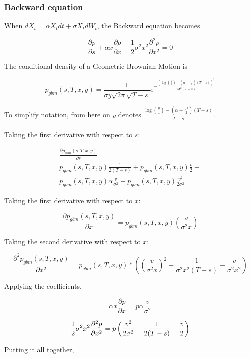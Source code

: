 \documentclass{article}
\theoremstyle{definition}
\begin{document}
\subsubsection{Backward equation}
When \(dX_t=\alpha X_t dt+\sigma X_t dW_t\), the Backward equation becomes

\[\frac{\partial p} {\partial s} +\alpha x \frac{\partial p}{\partial x} + \frac{1}{2} \sigma^2 x^2 \frac{\partial^2 p}{\partial x^2} =0\]

The conditional density of a Geometric Brownian Motion is

\[p_{gbm}(s, T, x, y)=\frac{1}{\sigma y\sqrt{2\pi} \sqrt{T-s} } e^{-\frac{\left( \log\left(\frac{y}{x}\right) -\left(\alpha-\frac{\sigma^2}{2}\right)(T-s)\right)^2}{2\sigma^2(T-s)}} \]

To simplify notation, from here on \(v\) denotes \(\frac{ \log\left(\frac{y}{x}\right) -\left(\alpha-\frac{\sigma^2}{2}\right)(T-s)}{T-s}\).
\\
\\
Taking the first derivative with respect to \(s\):


\begin{multline*}
\frac{\partial p_{gbm}(s, T, x, y)}{\partial s}  = \\ p_{gbm}(s, T, x, y) \frac{1}{2(T-s)} + p_{gbm}(s, T, x, y) \frac{v}{2}   - \\p_{gbm}(s, T, x, y) \alpha\frac{v}{\sigma^2}  -p_{gbm}(s, T, x, y)\frac{v^2}{2\sigma^2}  
\end{multline*}


Taking the first derivative with respect to \(x\):

\[\frac{\partial p_{gbm}(s, T, x, y)}{\partial x}=  p_{gbm}(s, T, x, y)\left(\frac{v }{\sigma^2 x}\right)  \]

Taking the second derivative with respect to \(x\):

\[\frac{\partial^2 p_{gbm}(s, T, x, y)}{\partial x^2}=  p_{gbm}(s, T, x, y)*\left(  \left(\frac{v }{\sigma^2 x}\right)^2 -\frac{1}{\sigma^2 x^2 (T-s)} - \frac{v }{\sigma^2 x^2}   \right)\]

Applying the coefficients,

\[\alpha x \frac{\partial p}{\partial x}=p \alpha \frac{v }{\sigma^2 }\]

\[\frac{1}{2} \sigma^2 x^2 \frac{\partial^2 p}{\partial x^2}\\=p\left( \frac{v^2 }{2\sigma^2}- \frac{1}{ 2(T-s)} - \frac{v }{ 2}      \right)\]

Putting it all together,
\end{document}
